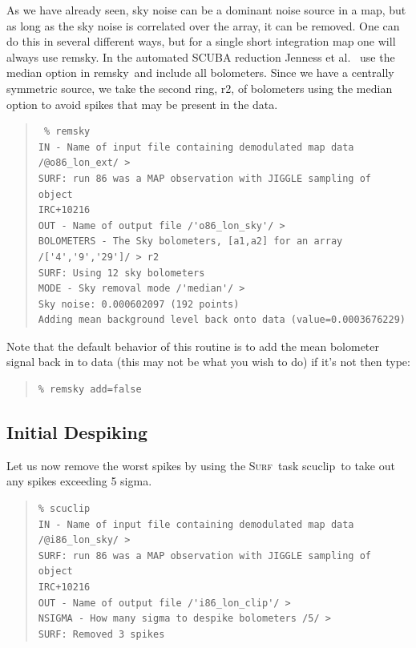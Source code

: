 \documentclass[twoside,11pt]{article}
\newenvironment{myquote}{\begin{quote}\begin{small}}{\end{small}\end{quote}}
\newcommand{\surf}{\xref{\textsc{Surf}}{sun216}{}}
\newcommand{\task}[1]{\textsf{#1}}
\newcommand{\remsky}{\xref{\task{remsky}}{sun216}{REMSKY}}
\newcommand{\scuclip}{\xref{\task{scuclip}}{sun216}{SCUCLIP}}
\newcommand{\xref}[3]{#1}
\newcommand{\xlabel}[1]{}
\renewcommand{\_}{\texttt{\symbol{95}}}
\begin{document}
As we have already seen, sky noise can be a dominant noise source in a
map, but as long as the sky noise is correlated over the array, it can
be removed.  One can do this in several different ways, but for a
single short integration map one will always use \remsky.  In the
automated SCUBA reduction Jenness et al.\  \cite{Jenness01} use the
median option in \remsky\ and include all bolometers.  Since we have a
centrally symmetric source, we take the second ring, r2, of bolometers
using the median option to avoid spikes that may be present in the
data.


\begin{myquote}
\begin{verbatim}
 % remsky
IN - Name of input file containing demodulated map data 
/@o86_lon_ext/ > 
SURF: run 86 was a MAP observation with JIGGLE sampling of object 
IRC+10216
OUT - Name of output file /'o86_lon_sky'/ > 
BOLOMETERS - The Sky bolometers, [a1,a2] for an array 
/['4','9','29']/ > r2
SURF: Using 12 sky bolometers
MODE - Sky removal mode /'median'/ > 
Sky noise: 0.000602097 (192 points)
Adding mean background level back onto data (value=0.0003676229)
\end{verbatim}
\end{myquote}

Note that the default behavior of this routine is to add the mean bolometer
signal back in to data (this may not be what you wish to do) if it's not then
type:

\begin{myquote}
\begin{verbatim}
% remsky add=false
\end{verbatim} 
\end{myquote}


\subsection{\xlabel{InitDespiking}Initial Despiking}

Let us now remove the worst spikes by using the \surf\ task \scuclip\
to take out any spikes exceeding 5 sigma.

\begin{myquote}
\begin{verbatim}
% scuclip
IN - Name of input file containing demodulated map data 
/@i86_lon_sky/ > 
SURF: run 86 was a MAP observation with JIGGLE sampling of object 
IRC+10216
OUT - Name of output file /'i86_lon_clip'/ > 
NSIGMA - How many sigma to despike bolometers /5/ > 
SURF: Removed 3 spikes
\end{verbatim}
\end{myquote}
\end{document}
